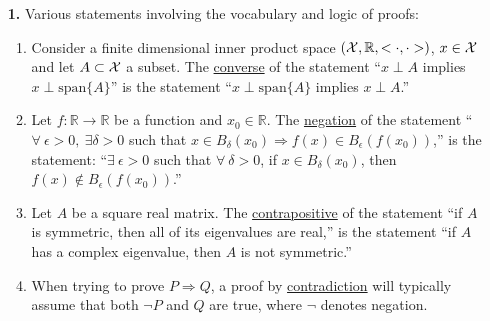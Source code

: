 \documentclass[letterpaper]{article}
\newcommand{\real}{\mathbb R}  %
\newcommand{\spanof}[1]{\textrm{span} \{ #1 \}}
\begin{document}
\vspace{0.5in}

\begin{enumerate}


\item[{\bf 1.}]  Various statements involving the vocabulary and logic of proofs:
\begin{enumerate}
\setlength{\itemsep}{.15in}
\renewcommand{\labelenumi}{(\alph{enumi})}
\setlength{\itemsep}{.1in}
\item Consider a finite dimensional inner product space $({\cal X},\real, <\cdot, \cdot>)$, $x\in {\cal X}$ and let $A \subset {\cal X}$ a subset. The  \underline{converse} of the statement ``$x \perp A$ implies $x \perp \spanof{A}$'' is the statement ``$x \perp \spanof{A}$ implies $x \perp A$.''

    \item  Let $f:\real \to \real$ be a function and $x_0 \in \real$. The \underline{negation} of the statement ``$\forall~\epsilon>0,~\exists \delta>0$ such that $x \in B_{\delta}(x_0) \Rightarrow f(x) \in
    B_\epsilon(f(x_0))$,'' is the statement: ``$\exists~\epsilon>0$ such that $\forall ~ \delta>0$,  if $ x \in B_{\delta}(x_0)$, then $f(x) \not \in B_\epsilon(f(x_0))$.''

    \item Let $A$ be a square real matrix. The  \underline{contrapositive} of the statement  ``if $A$ is symmetric, then all of its eigenvalues are real,'' is the statement ``if $A$ has a complex eigenvalue, then $A$ is not symmetric.''

        \item When trying to prove $P \Rightarrow Q$, a proof by \underline{contradiction} will typically assume that both $\neg P$ and $Q$ are true, where $\neg$ denotes negation.



\end{enumerate}
\end{enumerate}
\end{document}
